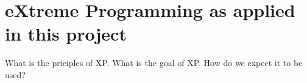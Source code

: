 \section{eXtreme Programming as applied in this project}
What is the priciples of XP.
What is the goal of XP.
How do we expect it to be used?
